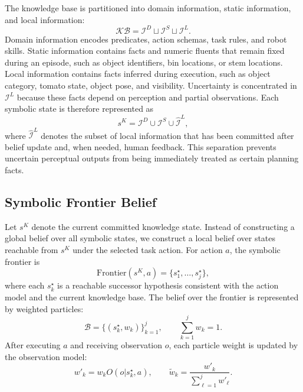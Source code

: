 The knowledge base is partitioned into domain information, static information, and local information:
\begin{equation}
\mathcal{KB}=\mathcal{I}^{D}\sqcup \mathcal{I}^{S}\sqcup \mathcal{I}^{L}.
\end{equation}
Domain information encodes predicates, action schemas, task rules, and robot skills. Static information contains facts and numeric fluents that remain fixed during an episode, such as object identifiers, bin locations, or stem locations. Local information contains facts inferred during execution, such as object category, tomato state, object pose, and visibility. Uncertainty is concentrated in $\mathcal{I}^{L}$ because these facts depend on perception and partial observations. Each symbolic state is therefore represented as
\begin{equation}
s^K = \mathcal{I}^{D} \cup \mathcal{I}^{S} \cup \hat{\mathcal{I}}^{L},
\end{equation}
where $\hat{\mathcal{I}}^{L}$ denotes the subset of local information that has been committed after belief update and, when needed, human feedback. This separation prevents uncertain perceptual outputs from being immediately treated as certain planning facts.

\subsection{Symbolic Frontier Belief}

Let $s^K$ denote the current committed knowledge state. Instead of constructing a global belief over all symbolic states, we construct a local belief over states reachable from $s^K$ under the selected task action. For action $a$, the symbolic frontier is
\begin{equation}
\mathrm{Frontier}(s^K,a)=\{s_1^\star,\ldots,s_j^\star\},
\label{eq:frontier}
\end{equation}
where each $s_k^\star$ is a reachable successor hypothesis consistent with the action model and the current knowledge base. The belief over the frontier is represented by weighted particles:
\begin{equation}
\mathcal{B}=\{(s_k^\star,w_k)\}_{k=1}^{j}, \qquad \sum_{k=1}^{j}w_k=1.
\label{eq:belief_particles}
\end{equation}
After executing $a$ and receiving observation $o$, each particle weight is updated by the observation model:
\begin{equation}
w'_k = w_k O(o|s_k^\star,a), \qquad
\tilde{w}_k = \frac{w'_k}{\sum_{\ell=1}^{j}w'_\ell}.
\label{eq:frontier_update}
\end{equation}

